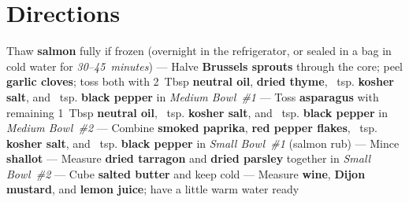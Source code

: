 \documentclass[11pt,letterpaper]{article}
\begin{document}
\section*{Directions}

\noindent
Thaw \textbf{salmon} fully if frozen (overnight in the refrigerator, or sealed in a bag in cold water for \textit{30--45~minutes}) ---
Halve \textbf{Brussels sprouts} through the core; peel \textbf{garlic cloves}; toss both with 2~Tbsp \textbf{neutral oil}, \textbf{dried thyme}, ~tsp. \textbf{kosher salt}, and ~tsp. \textbf{black pepper} in \textit{Medium Bowl~\#1} ---
Toss \textbf{asparagus} with remaining 1~Tbsp \textbf{neutral oil}, ~tsp. \textbf{kosher salt}, and ~tsp. \textbf{black pepper} in \textit{Medium Bowl~\#2} ---
Combine \textbf{smoked paprika}, \textbf{red pepper flakes}, ~tsp. \textbf{kosher salt}, and ~tsp. \textbf{black pepper} in \textit{Small Bowl~\#1} (salmon rub) ---
Mince \textbf{shallot} ---
Measure \textbf{dried tarragon} and \textbf{dried parsley} together in \textit{Small Bowl~\#2} ---
Cube \textbf{salted butter} and keep cold ---
Measure \textbf{wine}, \textbf{Dijon mustard}, and \textbf{lemon juice}; have a little warm water ready
\end{document}
